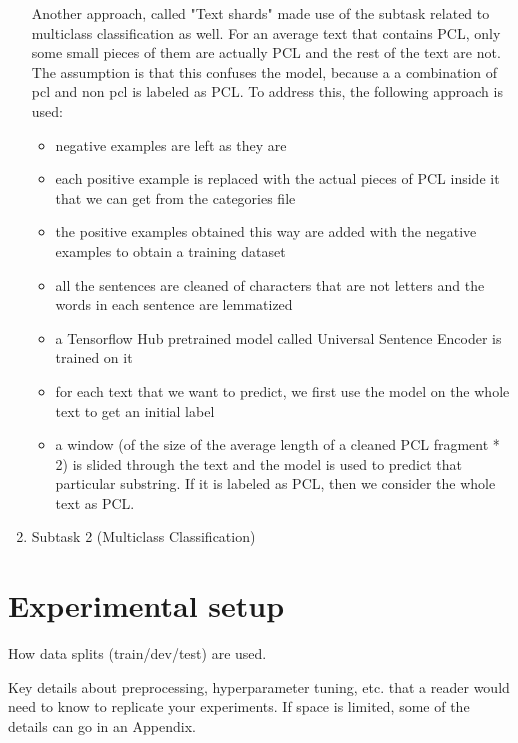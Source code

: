 \documentclass[11pt]{article}
\begin{document}
\begin{enumerate}
Another approach, called "Text shards" made use of the subtask related to
multiclass classification as well. For an average text that contains PCL,
only some small pieces of them are actually PCL and the rest of the text are
not. The assumption is that this confuses the model, because a a combination
of pcl and non pcl is labeled as PCL. To address this, the following
approach is used:

\begin{itemize}
\item negative examples are left as they are

\item each positive example is replaced with the actual pieces of PCL inside
it that we can get from the categories file

\item the positive examples obtained this way are added with the negative
examples to obtain a training dataset

\item all the sentences are cleaned of characters that are not letters and
the words in each sentence are lemmatized

\item a Tensorflow Hub pretrained model called Universal Sentence Encoder is
trained on it

\item for each text that we want to predict, we first use the model on the
whole text to get an initial label

\item a window (of the size of the average length of a cleaned PCL fragment
* 2) is slided through the text and the model is used to predict that
particular substring. If it is labeled as PCL, then we consider the whole
text as PCL.
\end{itemize}

\item Subtask 2 (Multiclass Classification)
\end{enumerate}

\section{Experimental setup}

How data splits (train/dev/test) are used.

Key details about preprocessing, hyperparameter tuning, etc. that a reader
would need to know to replicate your experiments. If space is limited, some
of the details can go in an Appendix.
\end{document}
